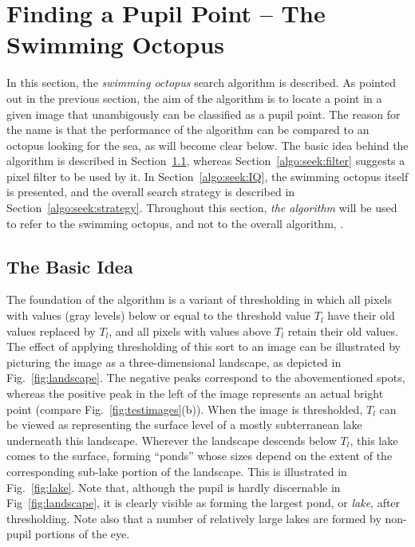 
\section{Finding a Pupil Point -- The Swimming Octopus}
\label{algo:seek}

In this section, the {\em swimming octopus\/} search algorithm is
described.  As pointed out in the previous section, the aim of the
algorithm is to locate a point in a given image that unambigously can
be classified as a pupil point.  The reason for the name is that the
performance of the algorithm can be compared to an octopus looking for
the sea, as will become clear below.  The basic idea behind the
algorithm is described in Section~\ref{algo:seek:idea}, whereas
Section~\ref{algo:seek:filter} suggests a pixel filter to be used by
it.  In Section~\ref{algo:seek:IQ}, the swimming octopus itself is
presented, and the overall search strategy is described in
Section~\ref{algo:seek:strategy}.  Throughout this section, {\em the
  algorithm\/} will be used to refer to the swimming octopus, and not
to the overall algorithm, {\octopus}.

\subsection{The Basic Idea}
\label{algo:seek:idea}


The foundation of the algorithm is a variant of thresholding in which
all pixels with values (gray levels) below or equal to the threshold
value $T_{l}$ have their old values replaced by $T_{l}$, and all
pixels with values above $T_{l}$ retain their old values.  The effect
of applying thresholding of this sort to an image can be illustrated
by picturing the image as a three-dimensional landscape, as depicted
in Fig.~\ref{fig:landscape}.  The negative peaks correspond to the
abovementioned spots, whereas the positive peak in the left of the
image represents an actual bright point (compare
Fig.~\ref{fig:testimages}(b)).  When the image is thresholded, $T_{l}$
can be viewed as representing the surface level of a mostly
subterranean lake underneath this landscape.  Wherever the landscape
descends below $T_{l}$, this lake comes to the surface, forming
``ponds'' whose sizes depend on the extent of the corresponding
sub-lake portion of the landscape.  This is illustrated in
Fig.~\ref{fig:lake}.  Note that, although the pupil is hardly
discernable in Fig~\ref{fig:landscape}, it is clearly visible as
forming the largest pond, or {\em lake\/}, after thresholding.  Note
also that a number of relatively large lakes are formed by non-pupil
portions of the eye.

